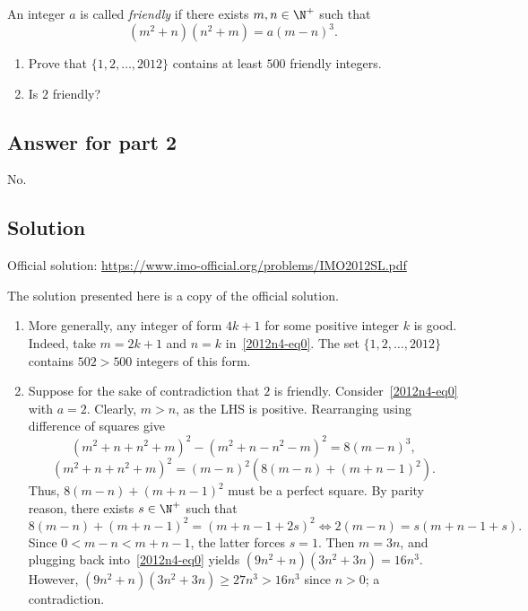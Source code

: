 An integer $a$ is called \emph{friendly} if there exists $m, n \in \N^+$ such that
\[ (m^2 + n)(n^2 + m) = a(m - n)^3. \tag{*}\label{2012n4-eq0} \]

\begin{enumerate}
    \item   Prove that $\{1, 2, \ldots, 2012\}$ contains at least $500$ friendly integers.
    \item   Is $2$ friendly?
\end{enumerate}



\subsection*{Answer for part 2}

No.



\subsection*{Solution}

Official solution: \url{https://www.imo-official.org/problems/IMO2012SL.pdf}

The solution presented here is a copy of the official solution.

\begin{enumerate}

    \item 
    More generally, any integer of form $4k + 1$ for some positive integer $k$ is good.
    Indeed, take $m = 2k + 1$ and $n = k$ in~\eqref{2012n4-eq0}.
    The set $\{1, 2, \ldots, 2012\}$ contains $502 > 500$ integers of this form.

    \item
    Suppose for the sake of contradiction that $2$ is friendly.
    Consider~\eqref{2012n4-eq0} with $a = 2$.
    Clearly, $m > n$, as the LHS is positive.
    Rearranging using difference of squares give
    \[ (m^2 + n + n^2 + m)^2 - (m^2 + n - n^2 - m)^2 = 8(m - n)^3, \]
    \[ (m^2 + n + n^2 + m)^2 = (m - n)^2 (8(m - n) + (m + n - 1)^2). \]
    Thus, $8(m - n) + (m + n - 1)^2$ must be a perfect square.
    By parity reason, there exists $s \in \N^+$ such that
    \[ 8(m - n) + (m + n - 1)^2 = (m + n - 1 + 2s)^2 \iff 2(m - n) = s(m + n - 1 + s). \]
    Since $0 < m - n < m + n - 1$, the latter forces $s = 1$.
    Then $m = 3n$, and plugging back into~\eqref{2012n4-eq0} yields $(9n^2 + n)(3n^2 + 3n) = 16n^3$.
    However, $(9n^2 + n)(3n^2 + 3n) \geq 27n^3 > 16n^3$ since $n > 0$; a contradiction.

\end{enumerate}
